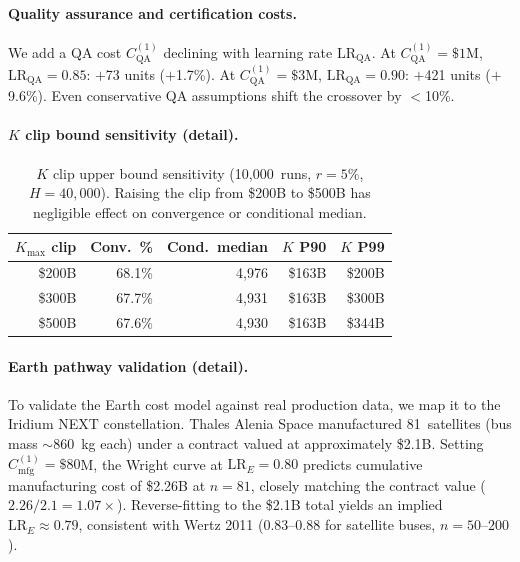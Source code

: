 \documentclass[preprint,12pt]{elsarticle}
\begin{document}
\paragraph{Quality assurance and certification costs.} We add a QA cost $C_{\mathrm{QA}}^{(1)}$ declining with learning rate $\mathrm{LR}_{\mathrm{QA}}$. At $C_{\mathrm{QA}}^{(1)} = \$1$M, $\mathrm{LR}_{\mathrm{QA}} = 0.85$: $+$73 units ($+$1.7\%). At $C_{\mathrm{QA}}^{(1)} = \$3$M, $\mathrm{LR}_{\mathrm{QA}} = 0.90$: $+$421 units ($+$9.6\%). Even conservative QA assumptions shift the crossover by $<$10\%.

\paragraph{$K$ clip bound sensitivity (detail).}

\begin{table}[htbp]
\centering
\caption{$K$ clip upper bound sensitivity (10{,}000~runs, $r = 5\%$, $H = 40{,}000$). Raising the clip from \$200B to \$500B has negligible effect on convergence or conditional median.}
\label{tab:k_clip}
\small
\begin{tabular}{@{}rrrrr@{}}
\toprule
$K_{\max}$ clip & Conv.\ \% & Cond.\ median & $K$ P90 & $K$ P99 \\
\midrule
\$200B & 68.1\% & 4{,}976 & \$163B & \$200B \\
\$300B & 67.7\% & 4{,}931 & \$163B & \$300B \\
\$500B & 67.6\% & 4{,}930 & \$163B & \$344B \\
\bottomrule
\end{tabular}
\end{table}

\paragraph{Earth pathway validation (detail).} To validate the Earth cost model against real production data, we map it to the Iridium NEXT constellation. Thales Alenia Space manufactured 81~satellites (bus mass $\sim$860~kg each) under a contract valued at approximately \$2.1B. Setting $C_{\mathrm{mfg}}^{(1)} = \$80$M, the Wright curve at $\mathrm{LR}_E = 0.80$ predicts cumulative manufacturing cost of \$2.26B at $n = 81$, closely matching the contract value ($2.26/2.1 = 1.07\times$). Reverse-fitting to the \$2.1B total yields an implied $\mathrm{LR}_E \approx 0.79$, consistent with Wertz 2011 \cite{wertz2011} (0.83--0.88 for satellite buses, $n = 50$--$200$).
\end{document}
